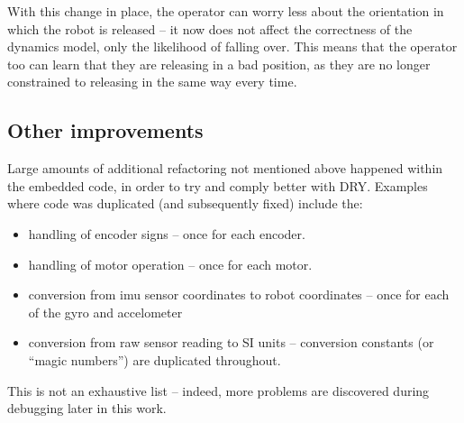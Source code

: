 \documentclass[main.tex]{subfiles}
\begin{document}

	With this change in place, the operator can worry less about the orientation in which the robot is released -- it now does not affect the correctness of the dynamics model, only the likelihood of falling over.
	This means that the operator too can learn that they are releasing in a bad position, as they are no longer constrained to releasing in the same way every time.


\subsection{Other improvements}
	Large amounts of additional refactoring not mentioned above happened within the embedded code, in order to try and comply better with DRY.
	Examples where code was duplicated (and subsequently fixed) include the:
	\begin{itemize}[noitemsep]
		\item handling of encoder signs -- once for each encoder.
		\item handling of motor operation -- once for each motor.
		\item conversion from imu sensor coordinates to robot coordinates -- once for each of the gyro and accelometer
		\item conversion from raw sensor reading to SI units -- conversion constants (or \enquote{magic numbers}) are duplicated throughout.
	\end{itemize}
	This is not an exhaustive list -- indeed, more problems are discovered during debugging later in this work.

\bib
\end{document}
